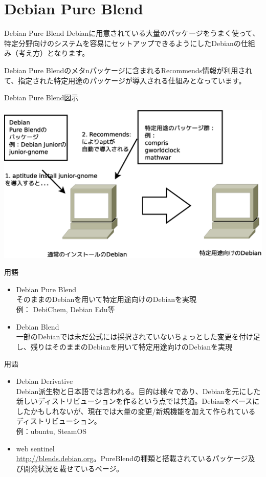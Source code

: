 \section{Debian Pure Blend}

\begin{frame}{Debian Pure Blend}
 Debianに用意されている大量のパッケージをうまく使って、特定分野向けのシステムを容易にセットアップできるようにしたDebianの仕組み（考え方）となります。

 Debian Pure Blendのメタnパッケージに含まれるRecommends情報が利用されて、指定された特定用途のパッケージが導入される仕組みとなっています。
\end{frame}

\begin{frame}{Debian Pure Blend図示}
\begin{center}
\includegraphics[width=0.8\hsize]{image201401/debian-pure-blend.eps}
\end{center}
\end{frame}

\begin{frame}{用語}
\begin{itemize} 
\item Debian Pure Blend\\
そのままのDebianを用いて特定用途向けのDebianを実現\\
例： DebiChem, Debian Edu等
\item Debian Blend \\
一部のDebianでは未だ公式には採択されていないちょっとした変更を付け足し、残りはそのままのDebianを用いて特定用途向けのDebianを実現
\end{itemize}
\end{frame}

\begin{frame}{用語}
\begin{itemize} 
\item Debian Derivative \\
Debian派生物と日本語では言われる。目的は様々であり、Debianを元にした新しいディストリビューションを作るという点では共通。Debianをベースにしたかもしれないが、現在では大量の変更/新規機能を加えて作られているディストリビューション。\\
例：ubuntu, SteamOS
\item web sentinel\\
\url{http://blends.debian.org}。PureBlendの種類と搭載されているパッケージ及び開発状況を載せているページ。
\end{itemize}
\end{frame}

